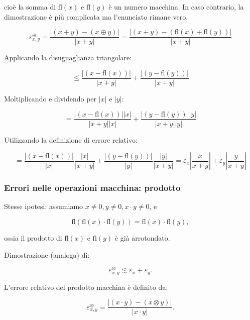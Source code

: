 \documentclass[a4paper, 11pt]{article}
\begin{document}
        cioè la somma di \(\text{fl}(x)\) e \(\text{fl}(y)\) è un numero macchina. In caso contrario, la dimostrazione è più complicata ma l'enunciato rimane vero.



        \[
        \varepsilon^{\oplus}_{x,y} = \frac{|(x + y) - (x \oplus y)|}{|x + y|}
        = \frac{|(x + y) - (\text{fl}(x) + \text{fl}(y))|}{|x + y|}
        \]



        Applicando la disuguaglianza triangolare:


        \[
        \leq \frac{|(x - \text{fl}(x))|}{|x + y|} + \frac{|(y - \text{fl}(y))|}{|x + y|}
        \]



        Moltiplicando e dividendo per \(|x|\) e \(|y|\):


        \[
        = \frac{|(x - \text{fl}(x))| |x|}{|x + y| |x|} + \frac{|(y - \text{fl}(y))| |y|}{|x + y| |y|}
        \]



        Utilizzando la definizione di errore relativo:


        \[
        = \frac{|(x - \text{fl}(x))|}{|x|} \frac{|x|}{|x + y|} + \frac{|(y - \text{fl}(y))|}{|y|} \frac{|y|}{|x + y|}
        = \varepsilon_x \left| \frac{x}{x + y} \right| + \varepsilon_y \left| \frac{y}{x + y} \right|
        \]

        
        \subsubsection{Errori nelle operazioni macchina: prodotto}

        Stesse ipotesi: assumiamo \( x \neq 0, y \neq 0, x \cdot y \neq 0 \), e


        \[
        \text{fl}(\text{fl}(x) \cdot \text{fl}(y)) = \text{fl}(x) \cdot \text{fl}(y),
        \]


        ossia il prodotto di \(\text{fl}(x)\) e \(\text{fl}(y)\) è già arrotondato.

        Dimostrazione (analoga) di:


        \[
        \varepsilon^{\otimes }_{x,y} \lesssim \varepsilon_x + \varepsilon_y.
        \]



        L'errore relativo del prodotto macchina è definito da:


        \[
        \varepsilon^{\otimes }_{x,y} = \frac{|(x \cdot y) - (x \otimes y)|}{|x \cdot y|}.
        \]
\end{document}
